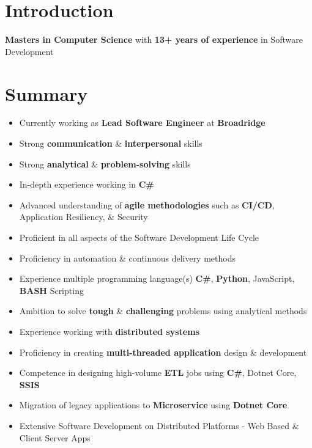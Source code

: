 \documentclass[letterpaper,11pt]{article}
\begin{document}
\section{Introduction}
\textbf{\color{darkgray}Masters in Computer Science} with \textbf{\color{darkgray}13+ years of experience} in Software Development

\section{Summary}
\begin{itemize}
    \item Currently working as \textbf{\color{darkgray}Lead Software Engineer} at \textbf{\color{darkgray}Broadridge}
    \item Strong \textbf{\color{darkgray}communication} \& \textbf{\color{darkgray}interpersonal} skills
    \item Strong \textbf{\color{darkgray}analytical} \& \textbf{\color{darkgray}problem-solving} skills
    \item In-depth experience working in \textbf{\color{darkgray}C\#}
    \item Advanced understanding of \textbf{\color{darkgray}agile methodologies} such as \textbf{\color{darkgray}CI/CD}, Application Resiliency, \& Security
    \item Proficient in all aspects of the Software Development Life Cycle
    \item Proficiency in automation \& continuous delivery methods
    \item Experience multiple programming language(s) \textbf{\color{darkgray}C\#}, \textbf{\color{darkgray}Python}, JavaScript, \textbf{\color{darkgray}BASH} Scripting
    \item Ambition to solve \textbf{\color{darkgray}tough} \& \textbf{\color{darkgray}challenging} problems using analytical methods
    \item Experience working with \textbf{\color{darkgray}distributed systems}
    \item Proficiency in creating \textbf{\color{darkgray}multi-threaded application} design \& development
    \item Competence in designing high-volume \textbf{\color{darkgray}ETL} jobs using \textbf{\color{darkgray}C\#}, Dotnet Core, \textbf{\color{darkgray}SSIS}
    \item Migration of legacy applications to \textbf{\color{darkgray}Microservice} using \textbf{\color{darkgray}Dotnet Core}
    \item Extensive Software Development on Distributed Platforms - Web Based \& Client Server Apps

\end{itemize}
\end{document}
